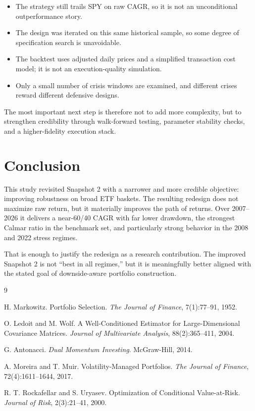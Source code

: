 \documentclass[11pt]{article}
\begin{document}
\begin{itemize}
    \item The strategy still trails SPY on raw CAGR, so it is not an unconditional outperformance story.
    \item The design was iterated on this same historical sample, so some degree of specification search is unavoidable.
    \item The backtest uses adjusted daily prices and a simplified transaction cost model; it is not an execution-quality simulation.
    \item Only a small number of crisis windows are examined, and different crises reward different defensive designs.
\end{itemize}

The most important next step is therefore not to add more complexity, but to strengthen credibility through walk-forward testing, parameter stability checks, and a higher-fidelity execution stack.

\section{Conclusion}

This study revisited Snapshot 2 with a narrower and more credible objective: improving robustness on broad ETF baskets. The resulting redesign does not maximize raw return, but it materially improves the path of returns. Over 2007--2026 it delivers a near-60/40 CAGR with far lower drawdown, the strongest Calmar ratio in the benchmark set, and particularly strong behavior in the 2008 and 2022 stress regimes.

That is enough to justify the redesign as a research contribution. The improved Snapshot 2 is not ``best in all regimes,'' but it is meaningfully better aligned with the stated goal of downside-aware portfolio construction.

\begin{thebibliography}{9}

H. Markowitz.
\newblock Portfolio Selection.
\newblock \emph{The Journal of Finance}, 7(1):77--91, 1952.

O. Ledoit and M. Wolf.
\newblock A Well-Conditioned Estimator for Large-Dimensional Covariance Matrices.
\newblock \emph{Journal of Multivariate Analysis}, 88(2):365--411, 2004.

G. Antonacci.
\newblock \emph{Dual Momentum Investing}.
\newblock McGraw-Hill, 2014.

A. Moreira and T. Muir.
\newblock Volatility-Managed Portfolios.
\newblock \emph{The Journal of Finance}, 72(4):1611--1644, 2017.

R. T. Rockafellar and S. Uryasev.
\newblock Optimization of Conditional Value-at-Risk.
\newblock \emph{Journal of Risk}, 2(3):21--41, 2000.

\end{thebibliography}
\end{document}
